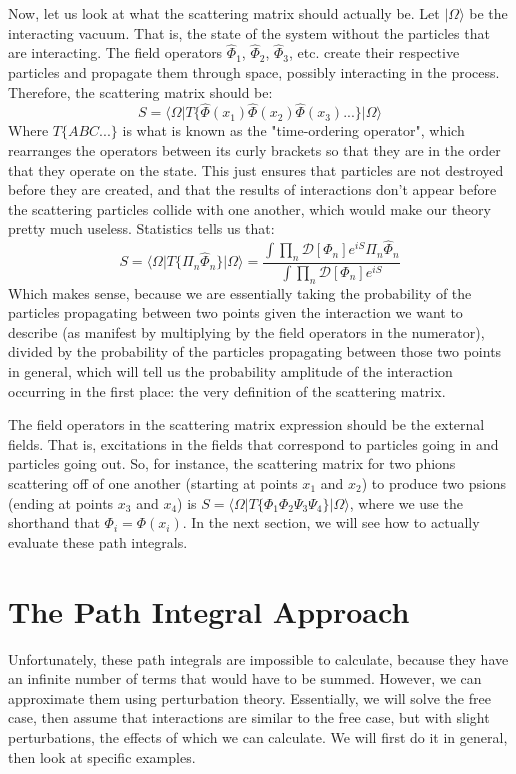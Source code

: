 \documentclass{report}
\begin{document}
Now, let us look at what the scattering matrix should actually be. Let $\vert \Omega \rangle$ be the interacting vacuum. That is, the state of the system without the particles that are interacting. The field operators $\hat{\Phi}_1$, $\hat{\Phi}_2$, $\hat{\Phi}_3$, etc. create their respective particles and propagate them through space, possibly interacting in the process. Therefore, the scattering matrix should be:
\[
S = \langle \Omega \vert T\{\hat{\Phi}(x_1)\hat{\Phi}(x_2)\hat{\Phi}(x_3)...\} \vert \Omega \rangle
\]
Where $T\{ABC...\}$ is what is known as the "time-ordering operator", which rearranges the operators between its curly brackets so that they are in the order that they operate on the state. This just ensures that particles are not destroyed before they are created, and that the results of interactions don't appear before the scattering particles collide with one another, which would make our theory pretty much useless. Statistics tells us that:
\[
S = \langle \Omega \vert T \{\Pi_n \hat{\Phi}_n\} \vert \Omega \rangle = \frac{\int \prod_n \mathcal{D}[\Phi_n] e^{iS}\Pi_n \hat{\Phi}_n}{\int \prod_n \mathcal{D}[\Phi_n] e^{iS}}
\]
Which makes sense, because we are essentially taking the probability of the particles propagating between two points given the interaction we want to describe (as manifest by multiplying by the field operators in the numerator), divided by the probability of the particles propagating between those two points in general, which will tell us the probability amplitude of the interaction occurring in the first place: the very definition of the scattering matrix.

The field operators in the scattering matrix expression should be the external fields. That is, excitations in the fields that correspond to particles going in and particles going out. So, for instance, the scattering matrix for two phions scattering off of one another (starting at points $x_1$ and $x_2$) to produce two psions (ending at points $x_3$ and $x_4$) is $S = \langle \Omega \vert T\{\Phi_1 \Phi_2 \Psi_3 \Psi_4 \} \vert \Omega \rangle$, where we use the shorthand that $\Phi_i = \Phi(x_i)$. In the next section, we will see how to actually evaluate these path integrals.

\chapter{The Path Integral Approach}
Unfortunately, these path integrals are impossible to calculate, because they have an infinite number of terms that would have to be summed. However, we can approximate them using perturbation theory. Essentially, we will solve the free case, then assume that interactions are similar to the free case, but with slight perturbations, the effects of which we can calculate. We will first do it in general, then look at specific examples.
\end{document}
